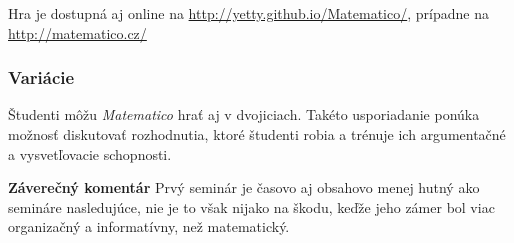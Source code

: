 Hra je dostupná aj online na \url{http://yetty.github.io/Matematico/}, prípadne na \url{http://matematico.cz/}

\subsubsection*{Variácie}

Študenti môžu \textit{Matematico} hrať aj v dvojiciach. Takéto usporiadanie ponúka možnosť diskutovať rozhodnutia, ktoré študenti robia a trénuje ich argumentačné a vysvetľovacie schopnosti.

\textbf{Záverečný komentár}
Prvý seminár je časovo aj obsahovo menej hutný ako semináre nasledujúce, nie je to však nijako na škodu, keďže jeho zámer bol viac organizačný a informatívny, než matematický.
